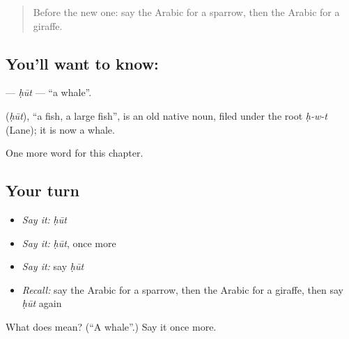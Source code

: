 \label{lesson:AR-C276-hut}



\begin{quote}
Before the new one: say the Arabic for a sparrow, then the Arabic for a giraffe.
\end{quote}

\subsection*{You'll want to know: }
\textbf{} — \emph{ḥūt} — \textquotedblleft{}a whale\textquotedblright{}.

\begin{cousinweb}
\textbf{} (\emph{ḥūt}), \textquotedblleft{}a fish, a large fish\textquotedblright{}, is an old native noun, filed under the root \emph{ḥ-w-t} (Lane); it is now a whale.
\end{cousinweb}

\begin{grammarlens}[title={What you've built}]
One more word for this chapter.
\end{grammarlens}

\subsection*{Your turn}
\begin{itemize}
\raggedright
  \item \emph{Say it:} \emph{ḥūt}
  \item \emph{Say it:} \emph{ḥūt}, once more
  \item \emph{Say it:} say \emph{ḥūt}
  \item \emph{Recall:} say the Arabic for a sparrow, then the Arabic for a giraffe, then say \emph{ḥūt} again
\end{itemize}

\begin{tcolorbox}[breakable,colback=teal!4,colframe=teal!35!black,title={Before you move on}]
What does  mean? (\textquotedblleft{}A whale\textquotedblright{}.) Say it once more.
\end{tcolorbox}
